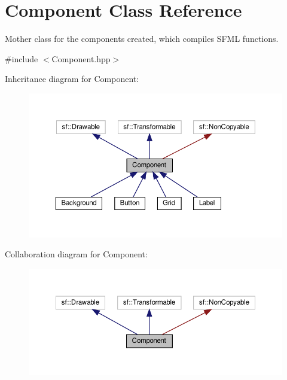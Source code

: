 \hypertarget{classComponent}{}\section{Component Class Reference}
\label{classComponent}


Mother class for the components created, which compiles S\+F\+ML functions.  




{\ttfamily \#include $<$Component.\+hpp$>$}



Inheritance diagram for Component\+:
\nopagebreak
\begin{figure}[H]
\begin{center}
\leavevmode
\includegraphics[width=350pt]{classComponent__inherit__graph}
\end{center}
\end{figure}


Collaboration diagram for Component\+:
\nopagebreak
\begin{figure}[H]
\begin{center}
\leavevmode
\includegraphics[width=350pt]{classComponent__coll__graph}
\end{center}
\end{figure}
